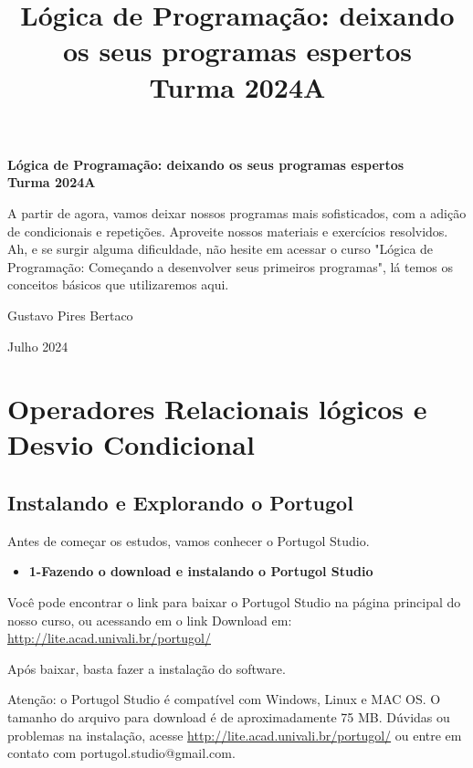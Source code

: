 \documentclass{article}
\title{\textbf{Lógica de Programação: deixando os seus programas espertos} \\ Turma 2024A}
\author{}
\date{}
\begin{document}
\begin{titlepage}
    \centering
    \vspace*{4cm}
    {\huge\bfseries Lógica de Programação: deixando os seus programas espertos \\ Turma 2024A\par}
    \vspace{2cm}
    \begin{tcolorbox}[colback=blue!5!white, colframe=blue!75!black, title=Descrição do Curso]
        \small A partir de agora, vamos deixar nossos programas mais sofisticados, com a adição de condicionais e repetições. Aproveite nossos materiais e exercícios resolvidos. Ah, e se surgir alguma dificuldade, não hesite em acessar o curso "Lógica de Programação: Começando a desenvolver seus primeiros programas", lá temos os conceitos básicos que utilizaremos aqui.
    \end{tcolorbox}
    \vfill
    {\Large Gustavo Pires Bertaco\par}
    {\large Julho 2024\par}
\end{titlepage}

\newpage

\renewcommand{\contentsname}{Sumário}
\tableofcontents

\newpage

\section{Operadores Relacionais lógicos e Desvio Condicional}
\subsection{Instalando e Explorando o Portugol}
Antes de começar os estudos, vamos conhecer o Portugol Studio.

\begin{itemize}
    \item \textbf{1-Fazendo o download e instalando o Portugol Studio}
\end{itemize}

Você pode encontrar o link para baixar o Portugol Studio na página principal do nosso curso, ou acessando em o link Download em: \href{http://lite.acad.univali.br/portugol/}{http://lite.acad.univali.br/portugol/}

Após baixar, basta fazer a instalação do software.

Atenção: o Portugol Studio é compatível com Windows, Linux e MAC OS. O tamanho do arquivo para download é de aproximadamente 75 MB. Dúvidas ou problemas na instalação, acesse \href{http://lite.acad.univali.br/portugol/}{http://lite.acad.univali.br/portugol/} ou entre em contato com portugol.studio@gmail.com. 
\end{document}
